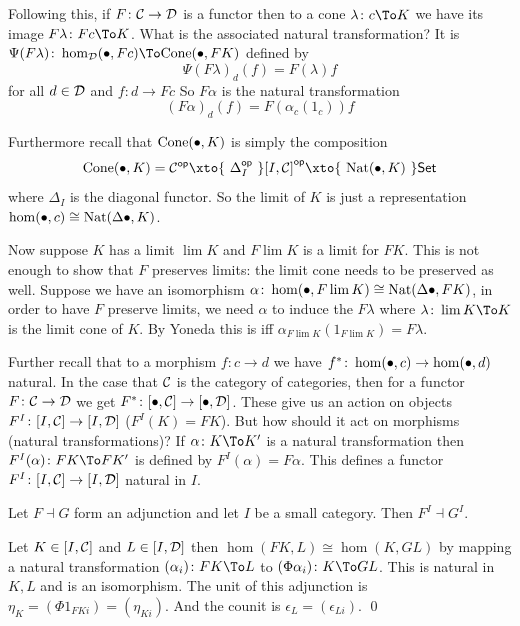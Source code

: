 Following this, if $F\colon{{\cal C}}\to{{\cal D}}$ is a functor then to a cone $\lambda\colon c\To K$ we have its image $F\lambda\colon Fc\To K$.
What is the associated natural transformation?
It is $\Psi(F\lambda)\colon\hom_\D(\bul,Fc)\To\cone(\bul,FK)$ defined by
$$ \Psi(F\lambda)_d(f) = F(\lambda)f $$
for all $d\in{{\cal D}}$ and $f\colon d\to Fc$
So $F\alpha$ is the natural transformation
$$ (F\alpha)_d(f) = F(\alpha_c(1_c))f $$

Furthermore recall that ${\rm Cone}(\bullet,K)$ is simply the composition
$$ \cone(\bul,K) = \C^\op \xto{\ \Delta_I^\op\ } [I,\C]^\op \xto{\ \nat(\bul,K)\ } \Set $$
where $\Delta_I$ is the diagonal functor.
So the limit of $K$ is just a representation $\hom(\bullet,c)\cong{\rm Nat}(\Delta\bullet,K)$.

Now suppose $K$ has a limit $\lim K$ and $F\lim K$ is a limit for $FK$.
This is not enough to show that $F$ preserves limits: the limit cone needs to be preserved as well.
Suppose we have an isomorphism $\alpha\colon\hom(\bullet,F\mathop{\rm lim}\nolimits K)\cong{\rm Nat}(\Delta\bullet,FK)$, in order to have $F$ preserve limits, we need $\alpha$ to induce the $F\lambda$
where $\lambda\colon\lim K\To K$ is the limit cone of $K$.
By Yoneda this is iff $\alpha_{F\lim K}(1_{F\lim K})=F\lambda$.

Further recall that to a morphism $f\colon c\to d$ we have $f^*\colon\hom(\bullet,c)\to\hom(\bullet,d)$ natural.
In the case that ${{\cal C}}$ is the category of categories, then for a functor $F\colon{{\cal C}}\to{{\cal D}}$ we get $F^*\colon[\bullet,{{\cal C}}]\to[\bullet,{{\cal D}}]$.
These give us an action on objects $F^I\colon[I,{{\cal C}}]\to[I,{{\cal D}}]$ ($F^I(K)=FK$).
But how should it act on morphisms (natural transformations)?
If $\alpha\colon K\To K'$ is a natural transformation then $F^I(\alpha)\colon FK\To FK'$ is defined by $F^I(\alpha)=F\alpha$.
This defines a functor $F^I\colon[I,{{\cal C}}]\to[I,{{\cal D}}]$ natural in $I$.

\bprop

    Let $F\dashv G$ form an adjunction and let $I$ be a small category.
    Then $F^I\dashv G^I$.

\eprop

\bproof

    Let $K\in[I,{{\cal C}}]$ and $L\in[I,{{\cal D}}]$ then $\hom(FK,L)\cong\hom(K,GL)$ by mapping a natural transformation $(\alpha_i)\colon FK\To L$ to $(\Phi\alpha_i)\colon K\To GL$.
    This is natural in $K,L$ and is an isomorphism.
    The unit of this adjunction is $\eta_K=(\Phi1_{FKi})=(\eta_{Ki})$.
    And the counit is $\epsilon_L=(\epsilon_{Li})$.
    \qed

\eproof

